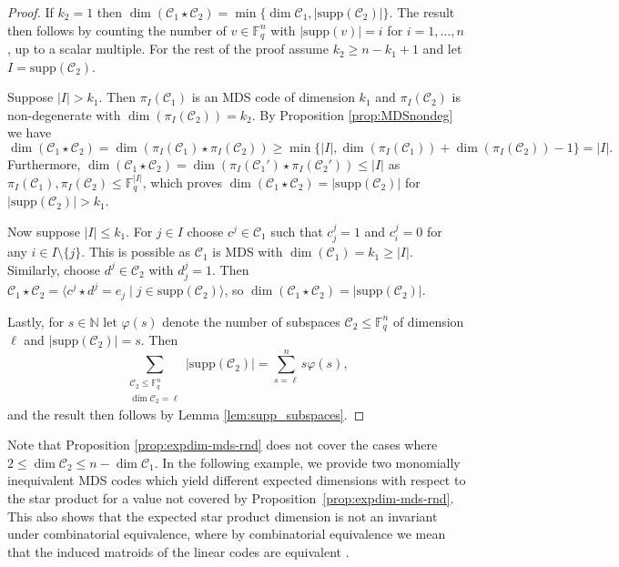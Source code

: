 \documentclass[a4paper,11pt,reqno]{article}
\newcommand{\F}{\mathbb{F}}
\newcommand{\supp}{\mathrm{supp}}
\newcommand{\C}{\mathcal{C}}
\theoremstyle{plain} \numberwithin{equation}{section}
\theoremstyle{definition}
\begin{document}
\begin{proof}
If $k_2=1$ then $\dim (\C_1\star \C_2) = \min \{\dim \C_1,|\mathrm{supp}(\C_2)|\}$. The result then follows by counting the number of $v\in \F_q^n$ with $|\mathrm{supp}(v)| = i$ for $i=1,\ldots,n$, up to a scalar multiple.
For the rest of the proof assume $k_2 \geq n-k_1+1$ and let $I = \supp(\C_2)$.

Suppose $|I|>k_1$. Then $\pi_{I}(\C_1)$ is an MDS code of dimension $k_1$ and $\pi_{I}(\C_2)$ is non-degenerate with $\dim(\pi_{I}(\C_2)) =k_2$. By Proposition \ref{prop:MDSnondeg} we have
\[ \dim(\C_1\star \C_2) = \dim ( \pi_{I}(\C_1)\star \pi_{I}(\C_2)) \geq \min \{|I|, \dim(\pi_{I}(\C_1))+\dim(\pi_{I}(\C_2)) - 1\} = |I|.\]
Furthermore, $\dim(\C_1\star \C_2) = \dim ( \pi_{I}(\C_1')\star \pi_{I}(\C_2')) \leq |I|$ as $\pi_{I}(\C_1),\pi_{I}(\C_2)\leq \F_q^{|I|}$, which proves $\dim(\C_1\star \C_2) =|\supp(\C_2)|$ for $|\supp(\C_2)|>k_1$.

Now suppose $|I|\leq k_1$. For $j\in I$ choose $c^j\in \C_1$ such that $c^j_j = 1$ and $c^j_i = 0$ for any $i\in I\setminus\{j\}$. This is possible as $\C_1$ is MDS with $\dim(\C_1)= k_1 \geq |I|$. Similarly, choose $d^j\in \C_2$ with $d^j_j = 1$. Then $\C_1\star \C_2 = \langle c^j\star d^j = e_j \; |\; j \in \supp(\C_2)\rangle$, so $\dim(\C_1\star \C_2) = |\supp(\C_2)|$.

Lastly, for $s\in \mathbb{N}$ let $\varphi(s)$ denote the number of subspaces $\C_2\leq \F_q^n$ of dimension $\ell$ and $|\supp(\C_2)|=s$. Then
\[
\sum_{\substack{\C_2 \leq \F_q^n \\ \dim \C_2 = \ell}} |\supp(\C_2)| = \sum^{n}_{s= \ell} s\varphi(s),
\]
and the result then follows by Lemma \ref{lem:supp_subspaces}.
\end{proof}

Note that Proposition \ref{prop:expdim-mds-rnd} does not cover the cases where $2\leq \dim \C_2 \leq n-\dim \C_1$. In the following example, we provide two monomially inequivalent MDS codes which yield different expected dimensions with respect to the star product for a value not covered by Proposition~\ref{prop:expdim-mds-rnd}. This also shows that the expected star product dimension is not an invariant under combinatorial equivalence, where by combinatorial equivalence we mean that the induced matroids of the linear codes are equivalent \cite{Oxley}.
\end{document}
